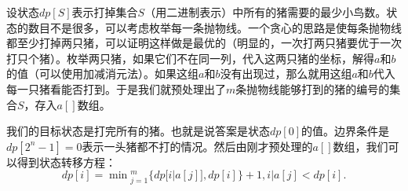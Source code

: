 \documentclass{article}
\theoremstyle{nonumberplain}
\begin{document}
设状态$dp[S]$表示打掉集合$S$（用二进制表示）中所有的猪需要的最少小鸟数。状态的数目不是很多，可以考虑枚举每一条抛物线。一个贪心的思路是使每条抛物线都至少打掉两只猪，可以证明这样做是最优的（明显的，一次打两只猪要优于一次打只个猪）。枚举两只猪，如果它们不在同一列，代入这两只猪的坐标，解得$a$和$b$的值（可以使用加减消元法）。如果这组$a$和$b$没有出现过，那么就用这组$a$和$b$代入每一只猪看能否打到。于是我们就预处理出了$m$条抛物线能够打到的猪的编号的集合$S$，存入$a[]$数组。

我们的目标状态是打完所有的猪。也就是说答案是状态$dp[0]$的值。边界条件是$dp[2^n-1]=0$表示一头猪都不打的情况。然后由刚才预处理的$a[]$数组，我们可以得到状态转移方程：
\begin{equation*}
dp[i]=\min\!^m_{j=1}\{dp[i|a[j]],dp[i]\}+1, i|a[j]<dp[i].
\end{equation*}
\end{document}
